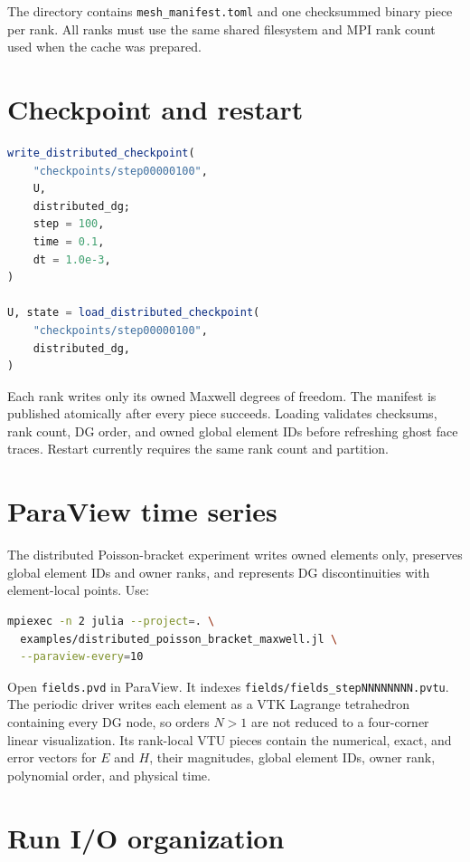 \documentclass[11pt,oneside]{book}
\newcommand{\code}[1]{\texttt{#1}}
\begin{document}
The directory contains \code{mesh\_manifest.toml} and one checksummed binary
piece per rank. All ranks must use the same shared filesystem and MPI rank
count used when the cache was prepared.

\section{Checkpoint and restart}

\begin{lstlisting}[language=julia]
write_distributed_checkpoint(
    "checkpoints/step00000100",
    U,
    distributed_dg;
    step = 100,
    time = 0.1,
    dt = 1.0e-3,
)

U, state = load_distributed_checkpoint(
    "checkpoints/step00000100",
    distributed_dg,
)
\end{lstlisting}

Each rank writes only its owned Maxwell degrees of freedom. The manifest is
published atomically after every piece succeeds. Loading validates checksums,
rank count, DG order, and owned global element IDs before refreshing ghost face
traces. Restart currently requires the same rank count and partition.

\section{ParaView time series}

The distributed Poisson-bracket experiment writes owned elements only,
preserves global element IDs and owner ranks, and represents DG discontinuities
with element-local points. Use:

\begin{lstlisting}[language=bash]
mpiexec -n 2 julia --project=. \
  examples/distributed_poisson_bracket_maxwell.jl \
  --paraview-every=10
\end{lstlisting}

Open \code{fields.pvd} in ParaView. It indexes
\code{fields/fields\_stepNNNNNNNN.pvtu}. The periodic driver writes each
element as a VTK Lagrange tetrahedron containing every DG node, so orders
\(N>1\) are not reduced to a four-corner linear visualization. Its rank-local
VTU pieces contain the numerical, exact, and error vectors for \(E\) and
\(H\), their magnitudes, global element IDs, owner rank, polynomial order, and
physical time.

\section{Run I/O organization}
\end{document}
